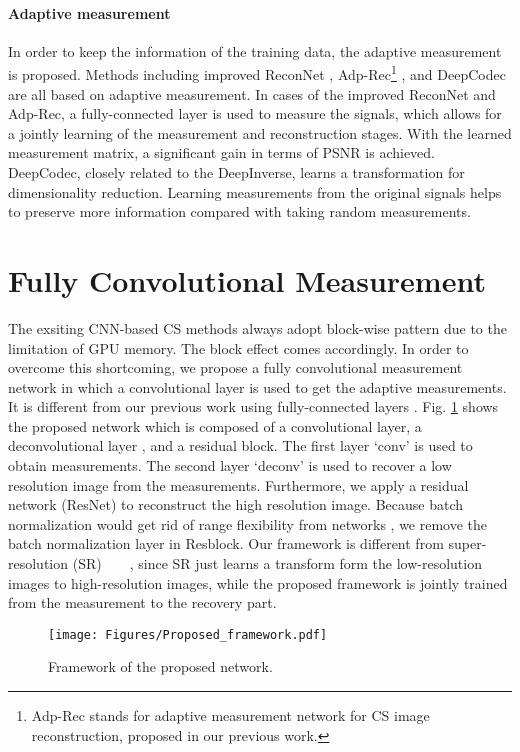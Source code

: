 \documentclass[review]{elsarticle}
\begin{document}
\paragraph{Adaptive measurement}
In order to keep the information of the training data, the adaptive measurement is proposed. Methods including improved ReconNet \cite{lohit2017convolutional}, Adp-Rec\footnote{Adp-Rec stands for adaptive measurement network for CS image reconstruction, proposed in our previous work.} \cite{xie2017adaptive}, and DeepCodec \cite{mousavi2017deepcodec} are all based on adaptive measurement. In cases of the improved ReconNet and Adp-Rec, a fully-connected layer is used to measure the signals, which allows for a jointly learning of the measurement and reconstruction stages. With the learned measurement matrix, a significant gain in terms of PSNR is achieved. DeepCodec, closely related to the DeepInverse, learns a transformation for dimensionality reduction. Learning measurements from the original signals helps to preserve more information compared with taking random measurements.

\section{Fully Convolutional Measurement}\label{section3}
The exsiting CNN-based CS methods always adopt block-wise pattern due to the limitation of GPU memory. The block effect comes accordingly. In order to overcome this shortcoming, we propose a fully convolutional measurement network in which a convolutional layer is used to get the adaptive measurements. It is different from our previous work using fully-connected layers \cite{xie2017adaptive}. Fig. \ref{fig:framework} shows the proposed network  which is composed of a convolutional layer, a deconvolutional layer \cite{xu2014deep}, and a residual block. The first layer `conv' is used to obtain measurements. The second layer `deconv' is used to recover a low resolution image from the measurements. Furthermore, we apply a residual network (ResNet) to reconstruct the high resolution image. Because batch normalization would get rid of range flexibility from networks \cite{lim2017enhanced}, we remove the batch normalization layer in Resblock. Our framework is different from super-resolution (SR)~\cite{deng2016similarity}~\cite{fan2017compressed}~\cite{dong2016image}~\cite{Ledig_2017_CVPR}, since SR just learns a transform form the low-resolution images to high-resolution images, while the proposed framework is jointly trained from the measurement to the recovery part.
\begin{figure}[h!]
	\centering
	\texttt{[image: Figures/Proposed\_framework.pdf]}
	\caption{Framework of the proposed network.}
	\label{fig:framework}
\end{figure}
\end{document}
